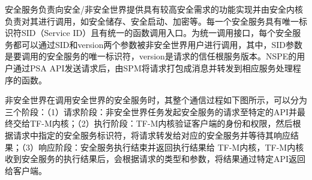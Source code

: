 \documentclass[12pt,a4paper]{ctexart}
\begin{document}
\par 安全服务负责向安全/非安全世界提供具有较高安全需求的功能实现并由安全内核负责对其进行调用，如安全储存、安全启动、加密等。每一个安全服务具有唯一标识符SID（Service ID）且有统一的函数调用入口。为统一调用接口，每个安全服务都可以通过SID和version两个参数被非安全世界用户进行调用，其中，SID参数是要调用的安全服务的唯一标识符，version是请求的信任根服务版本。NSPE的用户通过PSA API发送请求后，由SPM将请求打包成消息并转发到相应服务处理程序的函数。
\par 非安全世界在调用安全世界的安全服务时，其整个通信过程如下图所示，可以分为三个阶段：（1）请求阶段：非安全世界任务发起安全服务的请求至特定的API并最终交给TF-M内核；（2）执行阶段：TF-M内核验证客户端的身份和权限，然后根据请求中指定的安全服务标识符，将请求转发给对应的安全服务并等待其响应结果；（3）响应阶段：安全服务执行结束并返回执行结果给 TF-M内核，TF-M内核收到安全服务的执行结果后，会根据请求的类型和参数，将结果通过特定API返回给客户端。
\end{document}
